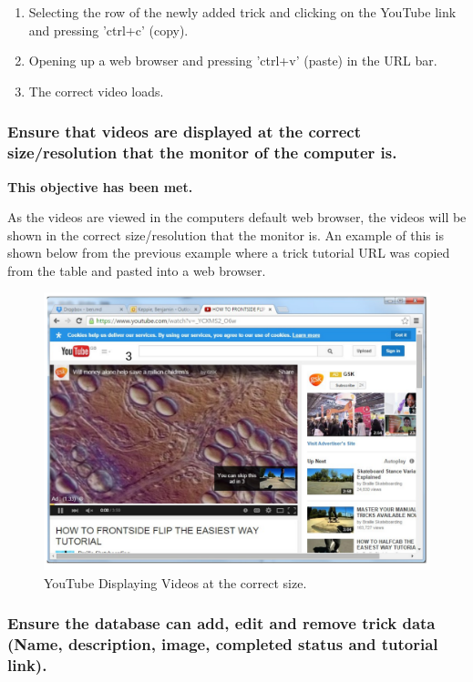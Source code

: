 \begin{enumerate}
\item Selecting the row of the newly added trick and clicking on the YouTube link and pressing 'ctrl+c' (copy).
\item Opening up a web browser and pressing 'ctrl+v' (paste) in the URL bar.
\item The correct video loads.
\end{enumerate}


\subsubsection {Ensure that videos are displayed at the correct size/resolution that the monitor of the computer is.} 

\textbf{This objective has been met.}

As the videos are viewed in the computers default web browser, the videos will be shown in the correct size/resolution that the monitor is. An example of this is shown below from the previous example where a trick tutorial URL was copied from the table and pasted into a web browser.

\begin{figure}[H]
    \includegraphics[width=\textwidth]{./Evaluation/images/LoadYouTube2.pdf}
    \caption{YouTube Displaying Videos at the correct size.} \label{fig:loadYouTube2}
\end{figure}



\subsubsection {Ensure the database can add, edit and remove trick data (Name, description, image, completed status and tutorial link).}

